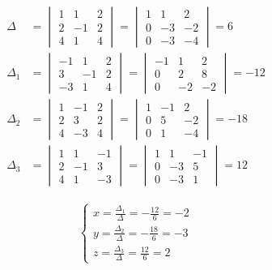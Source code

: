 \documentclass{article}
\begin{document}
\begin{enumerate}
\begin{align*}
\Delta &= \begin{vmatrix}
1&1&2\\
2&-1&2\\
4&1&4
\end{vmatrix}=\begin{vmatrix}
1&1&2\\
0&-3&-2\\
0&-3&-4
\end{vmatrix}=6\\
\Delta_1 &= \begin{vmatrix}
-1&1&2\\
3&-1&2\\
-3&1&4
\end{vmatrix}=\begin{vmatrix}
-1&1&2\\
0&2&8\\
0&-2&-2
\end{vmatrix}=-12\\
\Delta_2 &= \begin{vmatrix}
1&-1&2\\
2&3&2\\
4&-3&4
\end{vmatrix}=\begin{vmatrix}
1&-1&2\\
0&5&-2\\
0&1&-4
\end{vmatrix}=-18\\
\Delta_3 &= \begin{vmatrix}
1&1&-1\\
2&-1&3\\
4&1&-3
\end{vmatrix}=\begin{vmatrix}
1&1&-1\\
0&-3&5\\
0&-3&1
\end{vmatrix}=12
\end{align*}

\begin{align*}
\begin{cases}
x=\frac{\Delta_1}{\Delta}=-\frac{12}{6}=-2\\
y=\frac{\Delta_2}{\Delta}=-\frac{18}{6}=-3\\
z=\frac{\Delta_3}{\Delta}=\frac{12}{6}=2
\end{cases}
\end{align*}

\end{enumerate}
\end{document}
